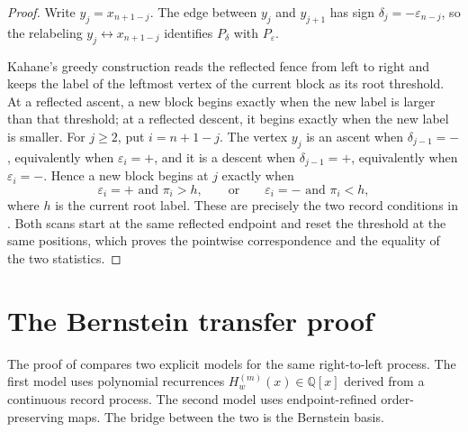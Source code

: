 \documentclass[11pt,letterpaper,reqno]{amsart}
\theoremstyle{definition}
\newtheorem{example}[theorem]{Example}
\DeclareMathOperator{\rec}{rec}
\DeclareMathOperator{\zzrec}{zzrec}
\newcommand{\eps}{\varepsilon}
\begin{document}
\begin{proof}
Write \(y_j=x_{n+1-j}\).  The edge between \(y_j\) and \(y_{j+1}\) has sign
\(\delta_j=-\eps_{n-j}\), so the relabeling \(y_j\leftrightarrow x_{n+1-j}\)
identifies \(P_\delta\) with \(P_\eps\).

Kahane's greedy construction reads the reflected fence from left to right and
keeps the label of the leftmost vertex of the current block as its root
threshold.  At a reflected ascent, a new block begins exactly when the new
label is larger than that threshold; at a reflected descent, it begins exactly
when the new label is smaller.  For \(j\ge2\), put \(i=n+1-j\).  The vertex
\(y_j\) is an ascent when \(\delta_{j-1}=-\), equivalently when
\(\eps_i=+\), and it is a descent when \(\delta_{j-1}=+\), equivalently when
\(\eps_i=-\).  Hence a new block begins at \(j\) exactly when
\[
\eps_i=+\text{ and }\pi_i>h,
\qquad\text{or}\qquad
\eps_i=-\text{ and }\pi_i<h,
\]
where \(h\) is the current root label.  These are precisely the two record
conditions in .  Both scans start at the
same reflected endpoint and reset the threshold at the same positions, which
proves the pointwise correspondence and the equality of the two statistics.
\end{proof}


\section{The Bernstein transfer proof}\label{sec:bernstein-proof}

The proof of  compares two explicit models for the same
right-to-left process.  The first model uses polynomial recurrences
\(H_w^{(m)}(x)\in\mathbb Q[x]\) derived from a continuous record process.  The
second model uses endpoint-refined order-preserving maps.  The bridge between
the two is the Bernstein basis.
\end{document}
